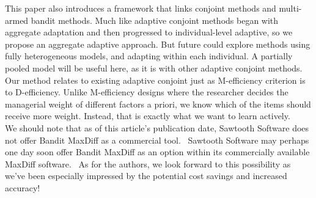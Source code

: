 \documentclass[nonblindrev]{informs3}
\begin{document}
This paper also introduces a framework that links conjoint methods and multi-armed bandit methods. Much like adaptive conjoint methods began with aggregate adaptation and then progressed to individual-level adaptive, so we propose an aggregate adaptive approach. But future could explore methods using fully heterogeneous models, and adapting within each individual. A partially pooled model will be useful here, as it is with other adaptive conjoint methods. \\

Our method relates to existing adaptive conjoint just as M-efficiency criterion is to D-efficiency.  Unlike M-efficiency designs where the researcher decides the managerial weight of different factors a priori, we know which of the items should receive more weight. Instead, that is exactly what we want to learn actively. \\


We should note that as of this article's publication date, Sawtooth Software does not offer Bandit MaxDiff as a commercial tool.  Sawtooth Software may perhaps one day soon offer Bandit MaxDiff as an option within its commercially available MaxDiff software.  As for the authors, we look forward to this possibility as we've been especially impressed by the potential cost savings and increased accuracy!








\ACKNOWLEDGMENT{%
}%


%
%
%



\end{document}
